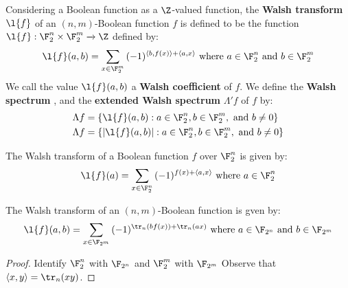 \begin{definition}
  Considering a Boolean function as a $\Z$-valued function, the  \textbf{Walsh
  transform} $\l{f}$ of an $(n,m)$-Boolean function $f$ is defined to be the
  function  $\l{f}:\F_2^n \times \F_2^m \xrightarrow{} \Z$ defined by:
  \begin{equation}\label{equation_1.11}
    \l{f}(a,b)=\sum_{x \in \F_2^m}{(-1)^{\langle b,f(x) \rangle+\langle a,x \rangle}}
    \text{ where } a \in \F_2^n \text{ and } b \in \F_2^m
  \end{equation}
  We call the value $\l{f}(a,b)$ a \textbf{Walsh coefficient} of $f$. We define
  the \textbf{Walsh spectrum} , and the \textbf{extended Walsh
  spectrum} $\Lambda'{f}$ of $f$ by:
  \begin{align*}
    \Lambda{f}    &=  \{\l{f}(a,b) : a \in \F_2^n, b \in \F_2^m, \text{ and } b
                        \neq 0\}  \\
    \Lambda{f}    &=  \{|\l{f}(a,b)| : a \in \F_2^n, b \in \F_2^m, \text{ and } b
                        \neq 0\}  \\
  \end{align*}
\end{definition}

\begin{lemma}\label{lemma_1.2.2}
  The Walsh transform of a Boolean function $f$ over  $\F_2^n$ is given by:
  \begin{equation}\label{equation_1.12}
    \l{f}(a)=\sum_{x \in \F_2^n}{(-1)^{f(x)+\langle a,x \rangle}} \text{ where }
    a \in \F_2^n
  \end{equation}
\end{lemma}

\begin{lemma}\label{lemma_1.2.3}
  The Walsh transform of an $(n,m)$-Boolean function is gven by:
  \begin{equation}\label{equation_1.12}
    \l{f}(a,b)=\sum_{x \in \F_{2^m}}{(-1)^{\tr_n(bf(x))+\tr_n(ax)}}
    \text{ where } a \in \F_{2^n} \text{ and } b \in \F_{2^m}
  \end{equation}
\end{lemma}
\begin{proof}
  Identify $\F_2^n$ with  $\F_{2^n}$ and $\F_2^m$ with  $\F_{2^m}$ Observe that
  $\langle x,y \rangle=\tr_n(xy)$.
\end{proof}

